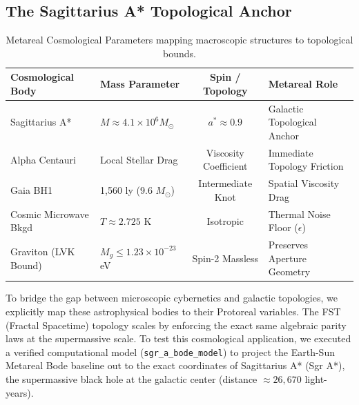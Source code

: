 \subsection{The Sagittarius A* Topological Anchor}

\begin{table}[ht]
\centering
\renewcommand{\arraystretch}{1.2}
\begin{tabular}{llcl}
\hline\hline
\textbf{Cosmological Body} & \textbf{Mass Parameter} & \textbf{Spin / Topology} & \textbf{Metareal Role} \\
\hline
Sagittarius A* & $M \approx 4.1 \times 10^6 M_\odot$ & $a^* \approx 0.9$ & Galactic Topological Anchor \\
Alpha Centauri & Local Stellar Drag & Viscosity Coefficient & Immediate Topology Friction \\
Gaia BH1 & 1,560 ly (9.6 $M_\odot$) & Intermediate Knot & Spatial Viscosity Drag \\
Cosmic Microwave Bkgd & $T \approx 2.725$ K & Isotropic & Thermal Noise Floor ($\epsilon$) \\
Graviton (LVK Bound) & $M_g \leq 1.23 \times 10^{-23}$ eV & Spin-2 Massless & Preserves Aperture Geometry \\
\hline\hline
\end{tabular}
\caption{Metareal Cosmological Parameters mapping macroscopic structures to topological bounds.}
\label{tab:cosmo_params}
\end{table}

To bridge the gap between microscopic cybernetics and galactic topologies, we explicitly map these astrophysical bodies to their Protoreal variables. The FST (Fractal Spacetime) topology scales by enforcing the exact same algebraic parity laws at the supermassive scale. 
To test this cosmological application, we executed a verified computational model (\texttt{sgr\_a\_bode\_model}) to project the Earth-Sun Metareal Bode baseline out to the exact coordinates of Sagittarius A* (Sgr A*), the supermassive black hole at the galactic center (distance $\approx 26,670$ light-years).

